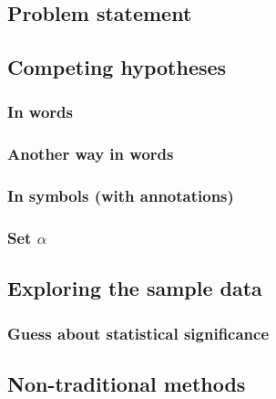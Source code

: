 \documentclass[
  12pt, krantz2,
]{krantz}
\begin{document}
\hypertarget{problem-statement-3}{%
\subsection{Problem statement}\label{problem-statement-3}}

\hypertarget{competing-hypotheses-3}{%
\subsection{Competing hypotheses}\label{competing-hypotheses-3}}

\hypertarget{in-words-3}{%
\subsubsection*{In words}\label{in-words-3}}


\hypertarget{another-way-in-words-1}{%
\subsubsection*{Another way in words}\label{another-way-in-words-1}}


\hypertarget{in-symbols-with-annotations-3}{%
\subsubsection*{In symbols (with annotations)}\label{in-symbols-with-annotations-3}}


\hypertarget{set-alpha-3}{%
\subsubsection*{\texorpdfstring{Set \(\alpha\)}{Set \textbackslash alpha}}\label{set-alpha-3}}


\hypertarget{exploring-the-sample-data-3}{%
\subsection{Exploring the sample data}\label{exploring-the-sample-data-3}}

\hypertarget{guess-about-statistical-significance-3}{%
\subsubsection*{Guess about statistical significance}\label{guess-about-statistical-significance-3}}


\hypertarget{non-traditional-methods-3}{%
\subsection{Non-traditional methods}\label{non-traditional-methods-3}}
\end{document}
